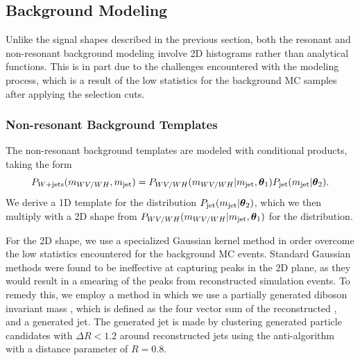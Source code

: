 \clearpage

\subsection{Background Modeling}
\label{sec:bkg}

Unlike the signal shapes described in the previous section, both the resonant and non-resonant background modeling involve 2D histograms rather than analytical functions.
This is in part due to the challenges encountered with the modeling process, which is a result of the low statistics for the background MC samples after applying the selection cuts.

\subsubsection{Non-resonant Background Templates}

The non-resonant background templates are modeled with conditional products, taking the form
\begin{equation}
  P_{W+\text{jets}}(m_{WV/WH},m_\mathrm{jet})=P_{WV/WH}(m_{WV/WH}|m_\mathrm{jet},\vb*{\theta}_1)P_\mathrm{jet}(m_\mathrm{jet}|\vb*{\theta}_2).
\end{equation}
We derive a 1D template for the \MJ distribution $P_\mathrm{jet}(m_\mathrm{jet}|\vb*{\theta}_2)$, which we then multiply with a 2D shape from $P_{WV/WH}(m_{WV/WH}|m_\mathrm{jet},\vb*{\theta}_1)$ for the \MVV distribution.

For the 2D \MVV shape, we use a specialized Gaussian kernel method in order overcome the low statistics encountered for the background MC events.
Standard Gaussian methods were found to be ineffective at capturing peaks in the 2D plane, as they would result in a smearing of the peaks from reconstructed simulation events.
To remedy this, we employ a method in which we use a partially generated diboson invariant mass \MVVpart, which is defined as the four vector sum of the reconstructed \Wlep, and a generated jet.
The generated jet is made by clustering generated particle candidates with $\Delta R<1.2$ around reconstructed jets using the anti-\kt algorithm with a distance parameter of $R=0.8$.

